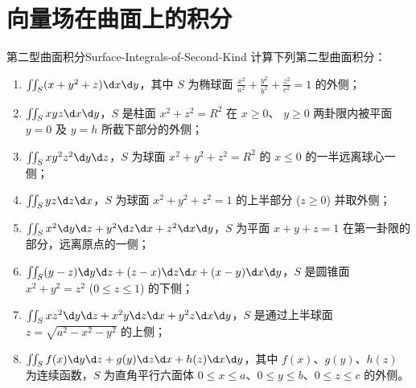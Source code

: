 \section{向量场在曲面上的积分}

\begin{problem}{第二型曲面积分}{Surface-Integrals-of-Second-Kind}
    计算下列第二型曲面积分：
    \begin{enumerate}
        \item $\iint_{S} (x + y^2 + z) \d x \d y$，其中 $S$ 为椭球面 $\frac{x^2}{a^2} + \frac{y^2}{b^2} + \frac{z^2}{c^2} = 1$ 的外侧；
        \item $\iint_{S} x y z \d x \d y$，$S$ 是柱面 $x^2 + z^2 = R^2$ 在 $x \ge 0$、 $y \ge 0$ 两卦限内被平面 $y = 0$ 及 $y = h$ 所截下部分的外侧；
        \item $\iint_{S} x y^2 z^2 \d y \d z$，$S$ 为球面 $x^2 + y^2 + z^2 = R^2$ 的 $x \le 0$ 的一半远离球心一侧；
        \item $\iint_{S} y z \d z \d x$，$S$ 为球面 $x^2 + y^2 + z^2 = 1$ 的上半部分 ($z \ge 0$) 并取外侧；
        \item $\iint_{S} x^2 \d y \d z + y^2 \d z \d x + z^2 \d x \d y$，$S$ 为平面 $x + y + z = 1$ 在第一卦限的部分，远离原点的一侧；
        \item $\iint_{S} (y - z) \d y \d z + (z - x) \d z \d x + (x - y) \d x \d y$，$S$ 是圆锥面 $x^2 + y^2 = z^2$ ($0 \le z \le 1$) 的下侧；
        \item $\iint_{S} x z^2 \d y \d z + x^2 y \d z \d x + y^2 z \d x \d y$，$S$ 是通过上半球面 $z = \sqrt{a^2 - x^2 - y^2}$ 的上侧；
        \item $\iint_{S} f(x) \d y \d z + g(y) \d z \d x + h(z) \d x \d y$，其中 $f(x)$、$g(y)$、$h(z)$ 为连续函数，$S$ 为直角平行六面体 $0 \le x \le a$、$0 \le y \le b$、$0 \le z \le c$ 的外侧。
    \end{enumerate}
\end{problem}


